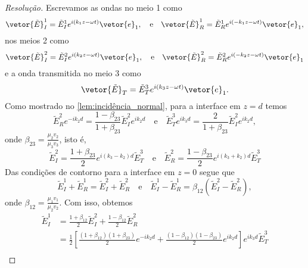 \begin{proof}[Resolução]
    Escrevamos as ondas no meio 1 como
    \begin{equation*}
        \vetor{\tilde{E}}^1_I = \tilde{E}^1_I e^{i(k_1z - \omega t)} \vetor{e}_1,\quad\text{e}\quad
        \vetor{\tilde{E}}^1_R = \tilde{E}^1_R e^{i(-k_1z - \omega t)} \vetor{e}_1,
    \end{equation*}
    nos meios 2 como
    \begin{equation*}
        \vetor{\tilde{E}}^2_I = \tilde{E}^2_I e^{i(k_2z - \omega t)} \vetor{e}_1,\quad\text{e}\quad
        \vetor{\tilde{E}}^2_R = \tilde{E}^2_R e^{i(-k_2z - \omega t)} \vetor{e}_1
    \end{equation*}
    e a onda transmitida no meio 3 como
    \begin{equation*}
        \vetor{\tilde{E}}_T = \tilde{E}^3_T e^{i(k_3z - \omega t)} \vetor{e}_1.
    \end{equation*}
    Como mostrado no \cref{lem:incidência_normal}, para a interface em \(z = d\) temos
    \begin{equation*}
        \tilde{E}_R^2 e^{-i k_2 d} = \frac{1 - \beta_{23}}{1 + \beta_{23}} \tilde{E}_I^2 e^{ik_2 d}
        \quad\text{e}\quad
        \tilde{E}_T^3 e^{ik_3 d} = \frac{2}{1 + \beta_{23}} \tilde{E}_I^2 e^{ik_2 d},
    \end{equation*}
    onde \(\beta_{23} = \frac{\mu_2 v_2}{\mu_3 v_3}\), isto é,
    \begin{equation*}
        \tilde{E}_I^2  = \frac{1 + \beta_{23}}{2} e^{i(k_3 - k_2) d} \tilde{E}_T^3
        \quad\text{e}\quad
        \tilde{E}_R^2  = \frac{1 - \beta_{23}}{2} e^{i(k_3 + k_2) d} \tilde{E}_T^3
    \end{equation*}
    Das condições de contorno para a interface em \(z = 0\) segue que
    \begin{equation*}
        \tilde{E}^1_I + \tilde{E}^1_R = \tilde{E}^2_I + \tilde{E}^2_R\quad\text{e}\quad \tilde{E}^1_I - \tilde{E}^1_R = \beta_{12} \left(\tilde{E}^2_I - \tilde{E}^2_R\right),
    \end{equation*}
    onde \(\beta_{12}=\frac{\mu_1v_1}{\mu_2 v_2}\). Com isso, obtemos
    \begin{align*}
        \tilde{E}_I^1 &= \frac{1 + \beta_{12}}{2} \tilde{E}_I^2 + \frac{1 - \beta_{12}}{2} \tilde{E}_R^2 \\
                      &= \frac12\left[\frac{(1 + \beta_{12})(1 + \beta_{23})}{2} e^{-i k_2 d} + \frac{(1 - \beta_{12})(1 - \beta_{23})}{2}e^{ik_2d}\right]e^{ik_3 d}\tilde{E}_T^3\\

\end{align*}
\end{proof}
